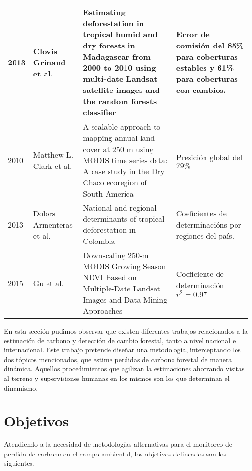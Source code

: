 \begin{longtable}{|p{3cm}|p{3cm}|p{3cm}|p{3cm}|}
		2013          & Clovis Grinand et al.                                  & Estimating deforestation in tropical humid and dry forests in Madagascar from 2000 to 2010 using multi-date Landsat satellite images and the random forests classifier & Error de comisi\'on del 85\% para coberturas estables y 61\% para coberturas con cambios. \\ \hline
		2010          & Matthew L. Clark et al.                                & A scalable approach to mapping annual land cover at 250 m using MODIS time series data: A case study in the Dry Chaco ecoregion of South America                       & Presici\'on global del $79\%$                                                             \\ \hline
		2013          & Dolors Armenteras et al.                               & National and regional determinants of tropical deforestation in Colombia                                                                                               & Coeficientes de determinaci\'ons por regiones del pa\'is.                                 \\ \hline
		2015          & Gu et al.                                         & Downscaling 250-m MODIS Growing Season NDVI Based on Multiple-Date Landsat Images and Data Mining Approaches                                                           & Coeficiente de determinaci\'on $ r^{2}=0.97 $                                             \\ \hline		 

	\end{longtable}


En esta secci\'on pudimos observar que existen diferentes trabajos relacionados a la estimaci\'on de carbono y detecci\'on de cambio forestal, tanto a nivel nacional e internacional. Este trabajo pretende dise\~{n}ar una metodolog\'ia, interceptando los dos t\'opicos mencionados, que estime perdidas de carbono forestal de manera din\'amica. Aquellos procedimientos que agilizan la estimaciones ahorrando visitas al terreno y supervisiones humanas en los mismos son los que determinan el dinamismo.


\section{Objetivos}
Atendiendo a la necesidad de metodolog\'ias alternativas para el monitoreo de perdida de carbono en el campo ambiental, los objetivos delineados son los siguientes.

